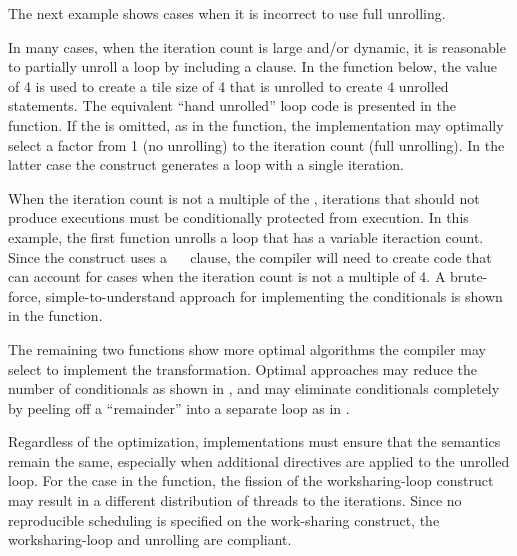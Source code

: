 The next example shows cases when it is incorrect to use full unrolling.


In many cases, when the iteration count is large and/or dynamic, it is
reasonable to partially unroll a loop by including a  clause.
In the  function below, the  value
of 4 is used to create a tile size of 4 that is unrolled to create 4 unrolled statements.
The equivalent ``hand unrolled'' loop code is presented in the 
 function.
If the  is omitted, as in the  
function, the implementation may optimally select a factor from 1 
(no unrolling) to the iteration count (full unrolling).  
In the latter case the construct generates a loop with a single iteration.


When the iteration count is not a multiple of the ,
iterations that should not produce executions must be conditionally
protected from execution. In this example, the first function
unrolls a loop that has a variable iteraction count. Since the 
construct uses a ~~\code{)} clause, the compiler will need to
create code that can account for cases when the iteration count is not a
multiple of 4. A brute-force, simple-to-understand approach for implementing 
the conditionals is shown in the  function.

The remaining two functions show more optimal algorithms the compiler 
may select to implement the transformation.
Optimal approaches may reduce the number of conditionals as shown in 
, and 
may eliminate conditionals completely by peeling off a ``remainder'' 
into a separate loop as in . 

Regardless of the optimization, implementations must ensure that the semantics
remain the same, especially when additional directives are applied to
the unrolled loop. For the case in the 
function, the fission of the worksharing-loop construct may result in a different
distribution of threads to the iterations. Since no reproducible scheduling
is specified on the work-sharing construct, the worksharing-loop and unrolling are compliant.

